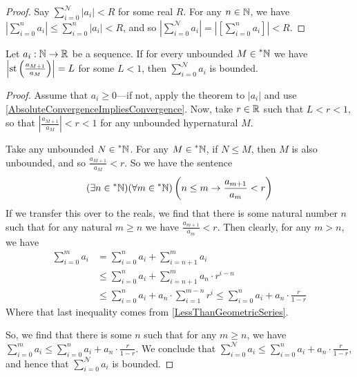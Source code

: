 \begin{proof}
    Say $\sum_{i = 0}^\mathcal{N} |a_i| < R$ for some real $R$. For any $n \in \mathbb{N}$, we have $\left|\sum_{i = 0}^n a_i\right| \leq \sum_{i = 0}^n |a_i| < R$, and so $\left|\sum_{i = 0}^\mathcal{N} a_i\right| = \left|[\sum_{i=0}^n a_i]\right| < R$.
\end{proof}

\begin{thm}\label{RatioTest}
    Let $a_i: \mathbb{N} \to \mathbb{R}$ be a sequence. If for every unbounded $M \in \prescript{*}{}{\mathbb{N}}$ we have $\left|\operatorname{st}\left(\frac{a_{M+1}}{a_M}\right)\right| = L$ for some $L < 1$, then $\sum_{i=0}^\mathcal{N} a_i$ is bounded.
\end{thm}

\begin{proof}
    Assume that $a_i \geq 0$---if not, apply the theorem to $|a_i|$ and use \ref{AbsoluteConvergenceImpliesConvergence}. Now, take $r \in \mathbb{R}$ such that $L < r < 1$, so that $\left|\frac{a_{M+1}}{a_M}\right| < r < 1$ for any unbounded hypernatural $M$.

    Take any unbounded $N \in \prescript{*}{}{\mathbb{N}}$. For any $M \in \prescript{*}{}{\mathbb{N}}$, if $N \leq M$, then $M$ is also unbounded, and so $\frac{a_{M+1}}{a_M} < r$. So we have the sentence
    \[ (\exists n \in \prescript{*}{}{\mathbb{N}})(\forall m \in \prescript{*}{}{\mathbb{N}})\left(n \leq m \to \frac{a_{m+1}}{a_m} < r\right) \]
    If we transfer this over to the reals, we find that there is some natural number $n$ such that for any natural $m \geq n$ we have $\frac{a_{m+1}}{a_m} < r$. Then clearly, for any $m > n$, we have 
    \begin{align*}
    \sum_{i = 0}^m a_i &= \sum_{i = 0}^n a_i + \sum_{i = n+1}^m a_i \\
        &\leq \sum_{i = 0}^n a_i + \sum_{i = n+1}^m a_n \cdot r^{i - n} \\
        &\leq \sum_{i = 0}^n a_i + a_n \cdot \sum_{i = 1}^{m-n}  r^{i} \leq \sum_{i = 0}^n a_i + a_n \cdot \frac{r}{1-r}
    \end{align*}
    Where that last inequality comes from \ref{LessThanGeometricSeries}.

    So, we find that there is some $n$ such that for any $m \geq n$, we have $\sum_{i = 0}^m a_i \leq \sum_{i = 0}^n a_i + a_n \cdot \frac{r}{1-r}$. We conclude that $\sum_{i = 0}^\mathcal{N} a_i \leq \sum_{i = 0}^n a_i + a_n \cdot \frac{r}{1-r}$, and hence that $\sum_{i = 0}^\mathcal{N} a_i$ is bounded.

\end{proof}